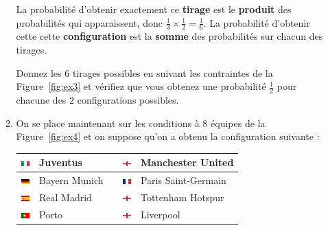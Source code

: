 \documentclass{../ficheTDTP}
\begin{document}
\begin{enumerate}
\begin{enumerate}
La probabilité d'obtenir exactement ce \textbf{tirage} est le \textbf{produit} des probabilités qui apparaissent, donc $\frac{1}{3} \times \frac{1}{2} = \frac{1}{6}$. 
La probabilité d'obtenir cette cette \textbf{configuration} est la \textbf{somme} des probabilités sur chacun des tirages.

Donnez les 6 tirages possibles en suivant les contraintes de la Figure~\ref{fig:ex3} et vérifiez que vous obtenez une probabilité $\frac{1}{2}$ pour chacune des 2 configurations possibles.

\item On se place maintenant sur les conditions à 8 équipes de la Figure~\ref{fig:ex4} et on suppose qu'on a obtenu la configuration suivante :


\begin{tabular}{|clccl|}
\hline
\includegraphics[height=0.2cm]{flags/it.png} & Juventus & & \includegraphics[height=0.2cm]{flags/en.png} & Manchester United \\ \hline
\includegraphics[height=0.2cm]{flags/de.png} & Bayern Munich & & \includegraphics[height=0.2cm]{flags/fr.png} & Paris Saint-Germain \\ \hline
\includegraphics[height=0.2cm]{flags/es.png} & Real Madrid & & \includegraphics[height=0.2cm]{flags/en.png} & Tottenham Hotspur \\ \hline
\includegraphics[height=0.2cm]{flags/po.png} & Porto & & \includegraphics[height=0.2cm]{flags/en.png} & Liverpool \\ \hline
\end{tabular}


\end{enumerate}
\end{enumerate}
\end{document}
